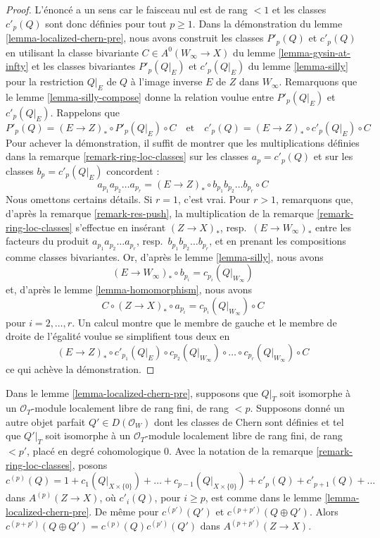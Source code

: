 \begin{proof}
L'énoncé a un sens car le faisceau nul est de rang $< 1$ et
les classes $c'_p(Q)$ sont donc définies pour tout $p \geq 1$.
Dans la démonstration du lemme \ref{lemma-localized-chern-pre}, nous avons construit
les classes $P'_p(Q)$ et $c'_p(Q)$ en utilisant la classe bivariante
$C \in A^0(W_\infty \to X)$ du lemme \ref{lemma-gysin-at-infty}
et les classes bivariantes
$P'_p(Q|_E)$ et $c'_p(Q|_E)$ du lemme \ref{lemma-silly} pour la restriction
$Q|_E$ de $Q$ à l'image inverse $E$ de $Z$ dans $W_\infty$.
Remarquons que le lemme \ref{lemma-silly-compose} donne la relation voulue
entre $P'_p(Q|_E)$ et $c'_p(Q|_E)$. Rappelons que
$$
P'_p(Q) = (E \to Z)_* \circ P'_p(Q|_E) \circ C
\quad\text{et}\quad
c'_p(Q) = (E \to Z)_* \circ c'_p(Q|_E) \circ C
$$
Pour achever la démonstration, il suffit de montrer que les multiplications définies
dans la remarque \ref{remark-ring-loc-classes} sur les classes $a_p = c'_p(Q)$
et sur les classes $b_p = c'_p(Q|_E)$ concordent :
$$
a_{p_1}a_{p_2} \ldots a_{p_r} =
(E \to Z)_* \circ b_{p_1}b_{p_2} \ldots b_{p_r} \circ C
$$
Nous omettons certains détails. Si $r = 1$, c'est vrai.
Pour $r > 1$, remarquons que, d'après la remarque \ref{remark-res-push}, la multiplication de la
remarque \ref{remark-ring-loc-classes} s'effectue
en insérant $(Z \to X)_*$, resp.\ $(E \to W_\infty)_*$ entre
les facteurs du produit
$a_{p_1}a_{p_2} \ldots a_{p_r}$, resp.\ $b_{p_1}b_{p_2} \ldots b_{p_r}$,
et en prenant les compositions comme classes bivariantes.
Or, d'après le lemme \ref{lemma-silly}, nous avons
$$
(E \to W_\infty)_* \circ b_{p_i} = c_{p_i}(Q|_{W_\infty})
$$
et, d'après le lemme \ref{lemma-homomorphism}, nous avons
$$
C \circ (Z \to X)_* \circ a_{p_i} = c_{p_i}(Q|_{W_\infty}) \circ C
$$
pour $i = 2, \ldots, r$. Un calcul
montre que le membre de gauche et le membre de droite de l'égalité voulue
se simplifient tous deux en
$$
(E \to Z)_* \circ c'_{p_1}(Q|_E) \circ
c_{p_2}(Q|_{W_\infty}) \circ \ldots \circ
c_{p_r}(Q|_{W_\infty}) \circ C
$$
ce qui achève la démonstration.
\end{proof}

\begin{lemma}
\label{lemma-localized-chern-pre-sum-c}
Dans le lemme \ref{lemma-localized-chern-pre}, supposons que $Q|_T$ soit isomorphe
à un $\mathcal{O}_T$-module localement libre de rang fini, de rang $< p$.
Supposons donné un autre objet parfait $Q' \in D(\mathcal{O}_W)$
dont les classes de Chern sont définies et tel que $Q'|_T$ soit isomorphe à un
$\mathcal{O}_T$-module localement libre de rang fini, de rang $< p'$, placé
en degré cohomologique $0$. Avec la notation de la
remarque \ref{remark-ring-loc-classes}, posons
$$
c^{(p)}(Q) = 1 + c_1(Q|_{X \times \{0\}}) + \ldots +
c_{p - 1}(Q|_{X \times \{0\}}) +
c'_{p}(Q) + c'_{p + 1}(Q) + \ldots
$$
dans $A^{(p)}(Z \to X)$, où $c'_i(Q)$, pour $i \geq p$, est comme dans le
lemme \ref{lemma-localized-chern-pre}. De même pour $c^{(p')}(Q')$ et
$c^{(p + p')}(Q \oplus Q')$.
Alors $c^{(p + p')}(Q \oplus Q') = c^{(p)}(Q)c^{(p')}(Q')$
dans $A^{(p + p')}(Z \to X)$.
\end{lemma}

